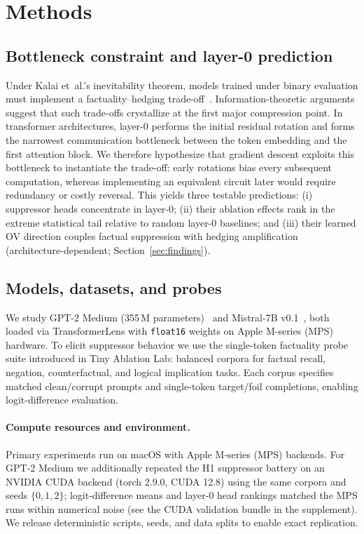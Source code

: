 \section{Methods}\label{sec:methods}

\subsection{Bottleneck constraint and layer-0 prediction}\label{sec:methods-layer0}
Under Kalai et~al.'s inevitability theorem, models trained under binary evaluation must implement a factuality–hedging trade-off~\cite{kalai2025why}.
Information-theoretic arguments suggest that such trade-offs crystallize at the first major compression point.
In transformer architectures, layer-0 performs the initial residual rotation and forms the narrowest communication bottleneck between the token embedding and the first attention block.
We therefore hypothesize that gradient descent exploits this bottleneck to instantiate the trade-off: early rotations bias every subsequent computation, whereas implementing an equivalent circuit later would require redundancy or costly reversal.
This yields three testable predictions: (i) suppressor heads concentrate in layer-0; (ii) their ablation effects rank in the extreme statistical tail relative to random layer-0 baselines; and (iii) their learned OV direction couples factual suppression with hedging amplification (architecture-dependent; Section~\ref{sec:findings}).

\subsection{Models, datasets, and probes}
We study GPT-2 Medium (355\,M parameters)~\cite{radford2019language} and Mistral-7B v0.1~\cite{jiang2023mistral}, both loaded via TransformerLens with \texttt{float16} weights on Apple M-series (MPS) hardware.
To elicit suppressor behavior we use the single-token factuality probe suite introduced in Tiny Ablation Lab: balanced corpora for factual recall, negation, counterfactual, and logical implication tasks.
Each corpus specifies matched clean/corrupt prompts and single-token target/foil completions, enabling logit-difference evaluation.

\paragraph{Compute resources and environment.}
Primary experiments run on macOS with Apple M‑series (MPS) backends. For GPT-2 Medium we additionally repeated the H1 suppressor battery on an NVIDIA CUDA backend (torch 2.9.0, CUDA 12.8) using the same corpora and seeds $\{0,1,2\}$; logit-difference means and layer-0 head rankings matched the MPS runs within numerical noise (see the CUDA validation bundle in the supplement). We release deterministic scripts, seeds, and data splits to enable exact replication.

